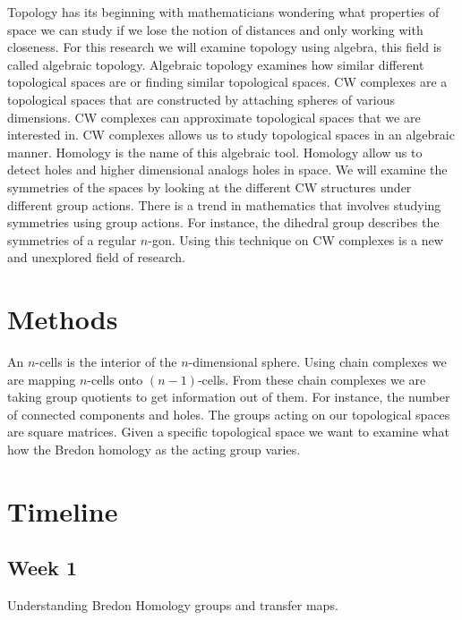 \documentclass[12pt]{article}
\begin{document}
Topology has its beginning with mathematicians wondering what properties of space we can study if we lose the notion of distances and only working with closeness.\cite{Allen_Hatcher_2001} For this research we will examine topology using algebra, this field is called algebraic topology.\cite{Allen_Hatcher_2001} Algebraic topology examines how similar different topological spaces are or finding similar topological spaces.\cite{Allen_Hatcher_2001}\newline
CW complexes are a topological spaces that are constructed by attaching spheres of various dimensions.\cite{Allen_Hatcher_2001} CW complexes can approximate topological spaces that we are interested in. CW complexes allows us to study topological spaces in an algebraic manner. Homology is the name of this algebraic tool. Homology allow us to detect holes and higher dimensional analogs holes in space.\newline
We will examine the symmetries of the spaces by looking at the different CW structures under different group actions. There is a trend in mathematics that involves studying symmetries using group actions. For instance, the dihedral group describes the symmetries of a regular $n$-gon. Using this technique on CW complexes is a new and unexplored field of research.

\section{Methods}
An $n$-cells is the interior of the $n$-dimensional sphere. Using chain complexes we are mapping $n$-cells onto $(n-1)$-cells. From these chain complexes we are taking group quotients to get information out of them. For instance, the number of connected components and holes.\cite{Beaudry}\newline
The groups acting on our topological spaces are square matrices. Given a specific topological space we want to examine what how the Bredon homology as the acting group varies.\cite{Beaudry}\newline

\section{Timeline}
\subsection{Week 1}
Understanding Bredon Homology groups and transfer maps.
\end{document}

